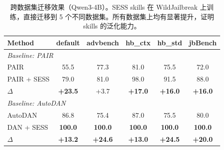 \begin{table}[t]
\centering
\caption{跨数据集迁移效果（Qwen3-4B）。SESS skills 在 WildJailbreak 上训练，直接迁移到 5 个不同数据集。所有数据集上均有显著提升，证明 skills 的泛化能力。}
\label{tab:transfer_datasets}
\small
\begin{tabular}{lccccc}
\toprule
\textbf{Method} & \textbf{default} & \textbf{advbench} & \textbf{hb\_ctx} & \textbf{hb\_std} & \textbf{jbBench} \\
\midrule
\multicolumn{6}{l}{\textit{Baseline: PAIR}} \\
PAIR & 55.5 & 77.3 & 81.0 & 75.5 & 72.0 \\
PAIR + SESS & 79.0 & 81.0 & 98.0 & 91.5 & 88.0 \\
$\Delta$ & \textbf{+23.5} & +3.7 & \textbf{+17.0} & \textbf{+16.0} & \textbf{+16.0} \\
\midrule
\multicolumn{6}{l}{\textit{Baseline: AutoDAN}} \\
AutoDAN & 86.8 & 75.4 & 87.0 & 75.5 & 80.0 \\
DAN + SESS & \textbf{100.0} & \textbf{100.0} & \textbf{100.0} & \textbf{100.0} & \textbf{100.0} \\
$\Delta$ & \textbf{+13.2} & \textbf{+24.6} & \textbf{+13.0} & \textbf{+24.5} & \textbf{+20.0} \\
\bottomrule
\end{tabular}
\end{table}

